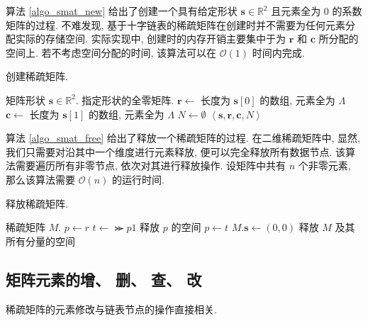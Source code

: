 算法 \ref{algo_smat_new} 给出了创建一个具有给定形状 $\bm{s} \in \mathbb{R}^2$ 且元素全为 0 的系数矩阵的过程. 不难发现, 基于十字链表的稀疏矩阵在创建时并不需要为任何元素分配实际的存储空间. 实际实现中, 创建时的内存开销主要集中于为 $\bm{r}$ 和 $\bm{c}$ 所分配的空间上. 若不考虑空间分配的时间, 该算法可以在 $\mathcal{O}(1)$ 时间内完成.
\begin{breakablealgorithm}
\caption{创建稀疏矩阵.}
\label{algo_smat_new}
\begin{algorithmic}[1]
\Require 矩阵形状 $\bm{s} \in \mathbb{R}^2.$
\Ensure 指定形状的全零矩阵.
    \State $\bm{r} \gets$ 长度为 $\bm{s}[0]$ 的数组, 元素全为 $\Lambda$
    \State $\bm{c} \gets$ 长度为 $\bm{s}[1]$ 的数组, 元素全为 $\Lambda$
    \State $N \gets \emptyset$
    \State \Return $\left\langle \bm{s}, \bm{r}, \bm{c}, N\right\rangle$
\EndFunction
\end{algorithmic}
\end{breakablealgorithm}

算法 \ref{algo_smat_free} 给出了释放一个稀疏矩阵的过程. 在二维稀疏矩阵中, 显然, 我们只需要对沿其中一个维度进行元素释放, 便可以完全释放所有数据节点. 该算法需要遍历所有非零节点, 依次对其进行释放操作. 设矩阵中共有 $n$ 个非零元素, 那么该算法需要 $\mathcal{O}(n)$ 的运行时间.
\begin{breakablealgorithm}
\caption{释放稀疏矩阵.}
\label{algo_smat_free}
\begin{algorithmic}[1]
\Require 稀疏矩阵 $M$.
        \State $p \gets r$
            \State $t \gets \Succ{p}{1}$
            \State 释放 $p$ 的空间
            \State $p \gets t$
        \EndWhile
    \EndFor
    \State $M.\bm{s} \gets (0, 0)$
    \State 释放 $M$ 及其所有分量的空间
\EndProcedure
\end{algorithmic}
\end{breakablealgorithm}

\subsection{矩阵元素的增、 删、 查、 改}

稀疏矩阵的元素修改与链表节点的操作直接相关.

